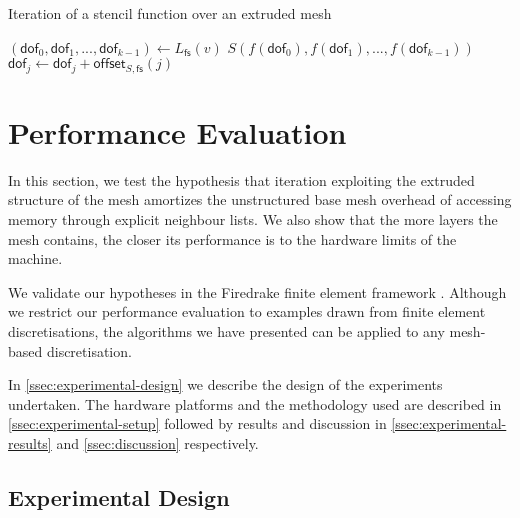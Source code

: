 \documentclass[11pt, a4paper]{scrartcl}
\begin{document}
\begin{algorithm}[th]
\caption{Iteration of a stencil function over an extruded mesh}
\label{alg:three}
\begin{algorithmic}
		\STATE $(\mathsf{dof}_{0}, \mathsf{dof}_{1}, ..., \mathsf{dof}_{k-1}) \leftarrow L_{\mathsf{fs}}(v)$
			\STATE $S(f(\mathsf{dof}_{0}), f(\mathsf{dof}_{1}), ..., f(\mathsf{dof}_{k-1}))$
				\STATE $\mathsf{dof}_{j} \leftarrow \mathsf{dof}_{j}+\mathsf{offset}_{S,\mathsf{fs}}(j)$
			\ENDFOR
		\ENDFOR
\ENDFOR
\end{algorithmic}
\end{algorithm}

\section{Performance Evaluation}
\label{sec:performance-evaluation}

In this section, we test the hypothesis that iteration exploiting the
extruded structure of the mesh amortizes the unstructured base mesh
overhead of accessing memory through explicit neighbour lists. We also
show that the more layers the mesh contains, the closer its
performance is to the hardware limits of the machine.

We validate our hypotheses in the Firedrake finite element framework
\citep{Rathgeber:2016}. Although we restrict our performance evaluation
to examples drawn from finite element discretisations, the algorithms
we have presented can be applied to any mesh-based discretisation.

In \autoref{ssec:experimental-design} we describe the design of the
experiments undertaken. The hardware platforms and the methodology
used are described in \autoref{ssec:experimental-setup} followed by
results and discussion in \autoref{ssec:experimental-results} and
\autoref{ssec:discussion} respectively.

\subsection{Experimental Design}
\label{ssec:experimental-design}
\end{document}
